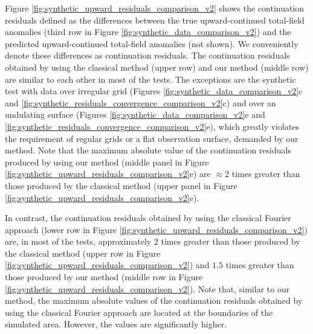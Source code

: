 \documentclass[manuscript]{geophysics}
\begin{document}
Figure \ref{fig:synthetic_upward_residuals_comparison_v2} shows the continuation residuals defined as the differences
between the true upward-continued total-field anomalies (third row in Figure
\ref{fig:synthetic_data_comparison_v2}) and the predicted upward-continued total-field 
anomalies (not shown). We conveniently denote these differences as continuation
residuals.
The continuation residuals 
obtained by using the classical method (upper row) and our method (middle row) are 
similar to each other in most of the tests.
The exceptions are the synthetic test with data over irregular grid (Figures \ref{fig:synthetic_data_comparison_v2}c and \ref{fig:synthetic_residuals_convergence_comparison_v2}c) and over an undulating surface 
(Figures \ref{fig:synthetic_data_comparison_v2}e and 
\ref{fig:synthetic_residuals_convergence_comparison_v2}e), which greatly violates the 
requirement of regular grids or a flat observation surface, demanded by our method.
Note that the maximum absolute value of the continuation residuals produced by using our 
method (middle panel in Figure \ref{fig:synthetic_upward_residuals_comparison_v2}e) 
are $\approx 2$ times greater than those produced by the classical method 
(upper panel in Figure \ref{fig:synthetic_upward_residuals_comparison_v2}e).

In contrast, the continuation residuals obtained by using the 
classical Fourier approach (lower row in Figure \ref{fig:synthetic_upward_residuals_comparison_v2})
are, in most of the tests, approximately $2$ times greater than those produced by the classical method 
(upper row in Figure \ref{fig:synthetic_upward_residuals_comparison_v2}) and $1.5$ times greater than
those produced by our method (middle row in Figure \ref{fig:synthetic_upward_residuals_comparison_v2}).
Note that, similar to our method, the maximum absolute values of the continuation residuals 
obtained by using the classical Fourier approach are located at the boundaries of the simulated area.
However, the values are significantly higher.
\end{document}

